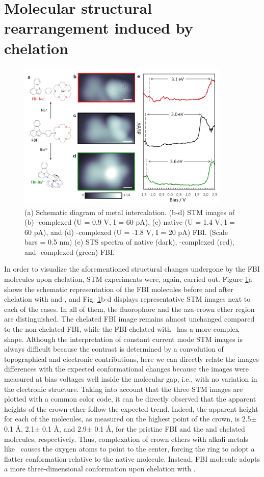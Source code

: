 \documentclass[aps,prl,reprint,longbibliography,superscriptaddress, english]{revtex4-1}
\begin{document}
\section{Molecular structural rearrangement induced by chelation}

\begin{figure}[ht!]
	\includegraphics[width=0.9\textwidth]{figures/Fig_STS.png}
	\caption{\label{Fig_STS} 
    (a) Schematic diagram of metal intercalation. (b-d) STM images of (b) \Nap-complexed (U = 0.9 V, I = 60 pA), (c) native (U = 1.4 V, I = 60 pA), and (d) \Bapp-complexed (U = -1.8 V, I = 20 pA) FBI. (Scale bars = 0.5 nm) (e) STS spectra of native (dark), \Nap-complexed (red), and \Bapp-complexed (green) FBI.}
\end{figure}

In order to visualize the aforementioned structural changes undergone by the FBI molecules upon chelation, 
 STM experiments were, again, carried out. Figure \ref{Fig_STS}a shows the schematic representation of the FBI molecules before and after chelation with \Nap and \Bapp, and Fig. \ref{Fig_STS}b-d displays representative STM images next to each of the cases. In all of them, the fluorophore and the aza-crown ether region are distinguished. The \Nap chelated FBI image remains almost unchanged compared to the non-chelated FBI, while the FBI chelated with \Bapp\ has a more complex shape. Although the interpretation of constant current mode STM images is always difficult because the contrast is determined by a convolution of topographical and electronic contributions, here we can directly relate the images differences with the expected conformational changes because the images were measured at bias voltages well inside the molecular gap, i.e., with no variation in the electronic structure. Taking into account that the three STM images are plotted with a common color code, it can be directly observed that the apparent heights of the crown ether follow the expected trend. Indeed, the apparent height for each of the molecules, as measured on the highest point of the crown, is 2.5$\pm$ 0.1 \AA, 2.1$\pm$ 0.1 \AA, and 2.9$\pm$ 0.1 \AA, for the pristine FBI and the \Nap and \Bapp chelated molecules, respectively. Thus, complexation of crown ethers with alkali metals like \Nap\ causes the oxygen atoms to point to the center, forcing the ring to adopt a flatter conformation relative to the native molecule. Instead, FBI molecule adopts a more three-dimensional conformation upon chelation with \Bapp.  
 
\end{document}
